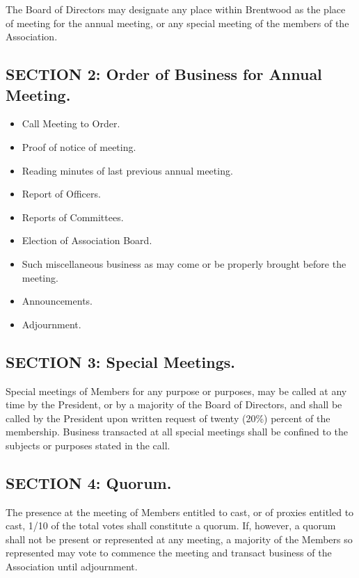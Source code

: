 The Board of Directors may designate any place within Brentwood as the
place of meeting for the annual meeting, or any special meeting of the
members of the Association.

\subsection{SECTION 2: Order of Business for Annual Meeting.}

\begin{itemize}
\item Call Meeting to Order.

\item Proof of notice of meeting.

\item Reading minutes of last previous annual meeting.

\item Report of Officers.

\item Reports of Committees.

\item Election of Association Board.

\item Such miscellaneous business as may come or be properly brought
before the meeting.

\item Announcements.

\item Adjournment.

\end{itemize}


\subsection{SECTION 3: Special Meetings.}
Special meetings of Members for any purpose or purposes, may be called at
any time by the President, or by a majority of the Board of Directors,
and shall be called by the President upon written request of twenty
(20\%) percent of the membership. Business transacted at all special
meetings shall be confined to the subjects or purposes stated in the call.


\subsection{SECTION 4: Quorum.}
The presence at the meeting of Members entitled to cast, or of proxies
entitled to cast, 1/10 of the total votes shall constitute a quorum. If,
however, a quorum shall not be present or represented at any meeting,
a majority of the Members so represented may vote to commence the meeting
and transact business of the Association until adjournment.

